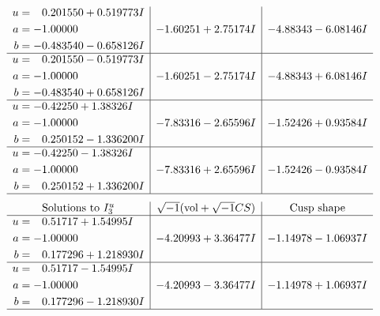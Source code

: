 \documentclass[1p]{elsarticle_modified}
\theoremstyle{definition}
\newcommand{\I}{\sqrt{-1}}
\begin{document}
$$\begin{array}{c|c|c}
\begin{aligned}
u &= \phantom{-}0.201550 + 0.519773 I \\
a &= -1.00000\phantom{ +0.000000I} \\
b &= -0.483540 - 0.658126 I\end{aligned}
 & -1.60251 + 2.75174 I & -4.88343 - 6.08146 I \\ \hline\begin{aligned}
u &= \phantom{-}0.201550 - 0.519773 I \\
a &= -1.00000\phantom{ +0.000000I} \\
b &= -0.483540 + 0.658126 I\end{aligned}
 & -1.60251 - 2.75174 I & -4.88343 + 6.08146 I \\ \hline\begin{aligned}
u &= -0.42250 + 1.38326 I \\
a &= -1.00000\phantom{ +0.000000I} \\
b &= \phantom{-}0.250152 - 1.336200 I\end{aligned}
 & -7.83316 - 2.65596 I & -1.52426 + 0.93584 I \\ \hline\begin{aligned}
u &= -0.42250 - 1.38326 I \\
a &= -1.00000\phantom{ +0.000000I} \\
b &= \phantom{-}0.250152 + 1.336200 I\end{aligned}
 & -7.83316 + 2.65596 I & -1.52426 - 0.93584 I\\
 \hline 
 \end{array}$$\newpage$$\begin{array}{c|c|c}  
\text{Solutions to }I^u_{3}& \I (\text{vol} + \sqrt{-1}CS) & \text{Cusp shape}\\
 \hline 
\begin{aligned}
u &= \phantom{-}0.51717 + 1.54995 I \\
a &= -1.00000\phantom{ +0.000000I} \\
b &= \phantom{-}0.177296 + 1.218930 I\end{aligned}
 & -4.20993 + 3.36477 I & -1.14978 - 1.06937 I \\ \hline\begin{aligned}
u &= \phantom{-}0.51717 - 1.54995 I \\
a &= -1.00000\phantom{ +0.000000I} \\
b &= \phantom{-}0.177296 - 1.218930 I\end{aligned}
 & -4.20993 - 3.36477 I & -1.14978 + 1.06937 I\\
 \hline 
 \end{array}$$\newpage\newpage\renewcommand{\arraystretch}{1}
\end{document}
